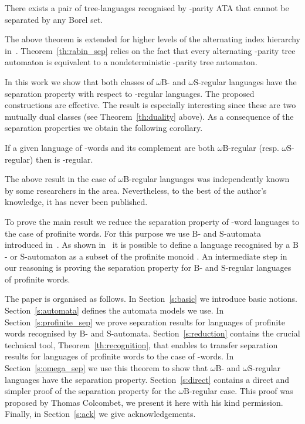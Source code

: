 \documentclass{LMCS}
\newcommand{\wB}{\ensuremath{\omega \mathrm{B}}\xspace}
\newcommand{\wS}{\ensuremath{\omega \mathrm{S}}\xspace}
\newcommand{\fB}{\ensuremath{\mathrm{B}}\xspace}
\newcommand{\fS}{\ensuremath{\mathrm{S}}\xspace}
\begin{document}
\begin{theorem}
There exists a pair of tree-languages recognised by -parity ATA that cannot be separated by any Borel set.
\end{theorem}

The above theorem is extended for higher levels of the alternating index hierarchy in~\cite{michalewski_separation}. Theorem~\ref{th:rabin_sep} relies on the fact that every alternating -parity tree automaton is equivalent to a nondeterministic -parity tree automaton.

In this work we show that both classes of \wB- and \wS-regular languages have the separation property with respect to -regular languages. The proposed constructions are effective. The result is especially interesting since these are two mutually dual classes (see Theorem~\ref{th:duality} above). As a consequence of the separation properties we obtain the following corollary.

\begin{corollary}
If a given language of -words  and its complement  are both \wB-regular (resp. \wS-regular) then  is -regular.
\end{corollary}

The above result in the case of \wB-regular languages was independently known by some researchers in the area. Nevertheless, to the best of the author's knowledge, it has never been published.

To prove the main result we reduce the separation property of -word languages to the case of profinite words. For this purpose we use \fB- and \fS-automata introduced in~\cite{colcombet_stabilisation}. As shown in~\cite{torunczyk_limitedness} it is possible to define a language recognised by a \fB- or \fS-automaton as a subset of the profinite monoid . An intermediate step in our reasoning is proving the separation property for \fB- and \fS-regular languages of profinite words.

The paper is organised as follows. In Section~\ref{s:basic} we introduce basic notions. Section~\ref{s:automata} defines the automata models we use. In Section~\ref{s:profinite_sep} we prove separation results for languages of profinite words recognised by \fB- and \fS-automata. Section~\ref{s:reduction} contains the crucial technical tool, Theorem~\ref{th:recognition}, that enables to transfer separation results for languages of profinite words to the case of -words. In Section~\ref{s:omega_sep} we use this theorem to show that \wB- and \wS-regular languages have the separation property. Section~\ref{s:direct} contains a direct and simpler proof of the separation property for the \wB-regular case. This proof was proposed by Thomas Colcombet, we present it here with his kind permission. Finally, in Section~\ref{s:ack} we give acknowledgements.
\end{document}
